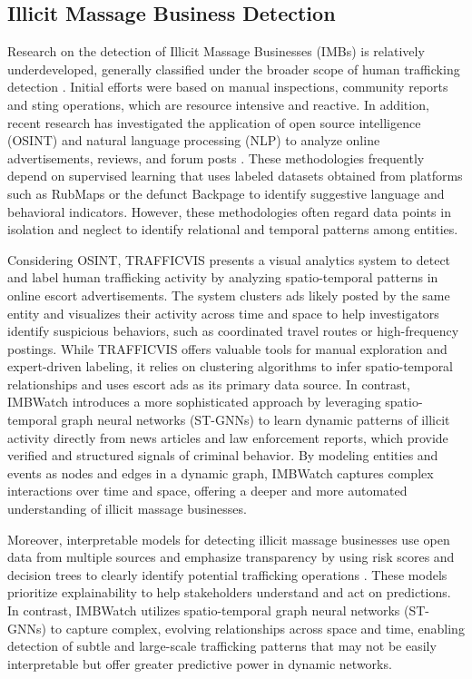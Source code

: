 \documentclass[letterpaper]{article} %
\begin{document}
\subsection{Illicit Massage Business Detection}

Research on the detection of Illicit Massage Businesses (IMBs) is relatively underdeveloped, generally classified under the broader scope of human trafficking detection \citep{ray2024optimal}. Initial efforts were based on manual inspections, community reports and sting operations, which are resource intensive and reactive. In addition, recent research has investigated the application of open source intelligence (OSINT) and natural language processing (NLP) to analyze online advertisements, reviews, and forum posts \cite{latonero2011human, dubrawski2015leveraging}. These methodologies frequently depend on supervised learning that uses labeled datasets obtained from platforms such as RubMaps or the defunct Backpage to identify suggestive language and behavioral indicators. However, these methodologies often regard data points in isolation and neglect to identify relational and temporal patterns among entities. 

Considering OSINT, TRAFFICVIS \cite{TrafficVis} presents a visual analytics system to detect and label human trafficking activity by analyzing spatio-temporal patterns in online escort advertisements. The system clusters ads likely posted by the same entity and visualizes their activity across time and space to help investigators identify suspicious behaviors, such as coordinated travel routes or high-frequency postings. While TRAFFICVIS offers valuable tools for manual exploration and expert-driven labeling, it relies on clustering algorithms to infer spatio-temporal relationships and uses escort ads as its primary data source. In contrast, IMBWatch introduces a more sophisticated approach by leveraging spatio-temporal graph neural networks (ST-GNNs) to learn dynamic patterns of illicit activity directly from news articles and law enforcement reports, which provide verified and structured signals of criminal behavior. By modeling entities and events as nodes and edges in a dynamic graph, IMBWatch captures complex interactions over time and space, offering a deeper and more automated understanding of illicit massage businesses.

Moreover, interpretable models for detecting illicit massage businesses use open data from multiple sources and emphasize transparency by using risk scores and decision trees to clearly identify potential trafficking operations \cite{Tobey03032024}. These models prioritize explainability to help stakeholders understand and act on predictions. In contrast, IMBWatch utilizes spatio-temporal graph neural networks (ST-GNNs) to capture complex, evolving relationships across space and time, enabling detection of subtle and large-scale trafficking patterns that may not be easily interpretable but offer greater predictive power in dynamic networks.
\end{document}

